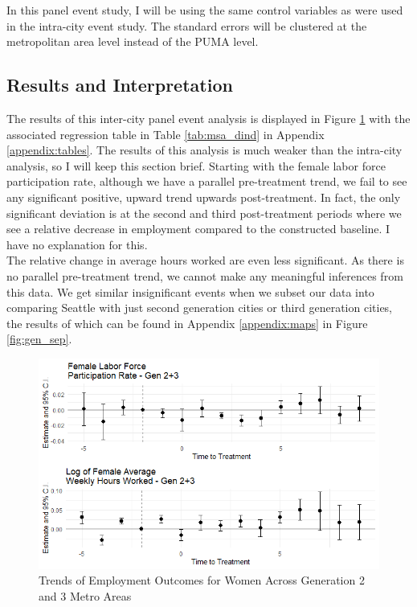 \documentclass{article}
\begin{document}
In this panel event study, I will be using the same control variables as were used in the intra-city event study. The standard errors will be clustered at the metropolitan area level instead of the PUMA level.\\

\subsection{Results and Interpretation}

The results of this inter-city panel event analysis is displayed in Figure \ref{gen_all} with the associated regression table in Table \ref{tab:msa_dind} in Appendix \ref{appendix:tables}. The results of this analysis is much weaker than the intra-city analysis, so I will keep this section brief.  Starting with the female labor force participation rate, although we have a parallel pre-treatment trend, we fail to see any significant positive, upward trend upwards post-treatment. In fact, the only significant deviation is at the second and third post-treatment periods where we see a relative decrease in employment compared to the constructed baseline. I have no explanation for this. \\

The relative change in average hours worked are even less significant. As there is no parallel pre-treatment trend, we cannot make any meaningful inferences from this data. We get similar insignificant events when we subset our data into comparing Seattle with just second generation cities or third generation cities, the results of which can be found in Appendix \ref{appendix:maps} in Figure \ref{fig:gen_sep}. \\

\begin{figure}[hbt!]
\caption{Trends of Employment Outcomes for Women Across Generation 2 and 3 Metro Areas}
\label{gen_all}
\centering
\includegraphics[width=1\textwidth]{Graphs/emp_outcome_allgen.png}
\end{figure}
\end{document}

